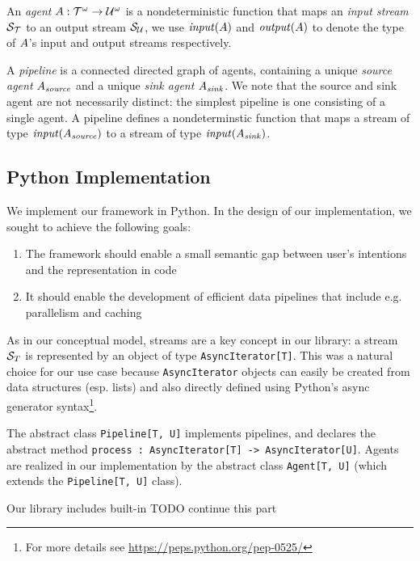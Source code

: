 An \emph{agent} $A : {\mathcal{T}}^{\omega} \rightarrow
{\mathcal{U}}^{\omega}$ is a nondeterministic function that maps an \emph{input
stream} $\mathcal{S}_{\mathcal{T}}$ to an output stream $\mathcal{S}_{\mathcal{U}}$, we
use $\mathit{input}(A)$ and $\mathit{output}(A)$ to denote the type of $A$'s
input and output streams respectively.

A \emph{pipeline} is a connected directed graph of agents, containing a
unique \emph{source agent} $A{}_{\mathit{source}}$ and a unique \emph{sink
agent} $A_{\mathit{sink}}$. We note that the source and sink agent are not
necessarily distinct: the simplest pipeline is one consisting of a single agent.
A pipeline defines a nondeterminstic function that maps a stream of type
$\mathit{input}(A_{\mathit{source}})$ to a stream of type
$\mathit{input}(A_{\mathit{sink}})$.

\subsection{Python Implementation}

We implement our framework in Python. In the design of our implementation, we
sought to achieve the following goals:

\begin{enumerate}
  \item The framework should enable a small semantic gap \cite{semanticgap}
  between user's intentions and the representation in code
  \item It should enable the development of efficient data pipelines that include
  e.g. parallelism and caching
\end{enumerate}

As in our conceptual model, streams are a key concept in our library: a stream
$\mathcal{S}_{T}$ is represented by an object of type \texttt{AsyncIterator[T]}. This
was a natural choice for our use case because \texttt{AsyncIterator} objects can
easily be created from data structures (esp. lists) and also directly defined
using Python's async generator syntax\footnote{For more details see
\url{https://peps.python.org/pep-0525/}}.

 The abstract class
\texttt{Pipeline[T, U]} implements pipelines, and declares the abstract method
\texttt{process : AsyncIterator[T] -> AsyncIterator[U]}. Agents are realized in
our implementation by the abstract class \texttt{Agent[T, U]} (which extends the
\texttt{Pipeline[T, U]} class).

Our library includes built-in TODO continue this part

